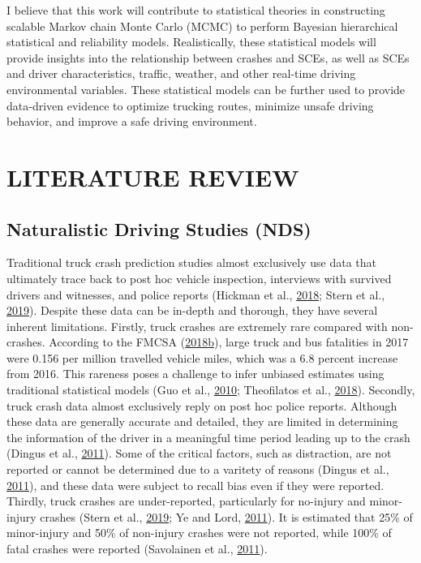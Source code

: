 \documentclass[12pt]{book}
\numberwithin{equation}{chapter}
\begin{document}
I believe that this work will contribute to statistical theories in constructing scalable Markov chain Monte Carlo (MCMC) to perform Bayesian hierarchical statistical and reliability models. Realistically, these statistical models will provide insights into the relationship between crashes and SCEs, as well as SCEs and driver characteristics, traffic, weather, and other real-time driving environmental variables. These statistical models can be further used to provide data-driven evidence to optimize trucking routes, minimize unsafe driving behavior, and improve a safe driving environment.

\hypertarget{literature-review}{%
\chapter{LITERATURE REVIEW}\label{literature-review}}

\hypertarget{naturalistic-driving-studies-nds}{%
\section{Naturalistic Driving Studies (NDS)}\label{naturalistic-driving-studies-nds}}

Traditional truck crash prediction studies almost exclusively use data that ultimately trace back to post hoc vehicle inspection, interviews with survived drivers and witnesses, and police reports (Hickman et al., \protect\hyperlink{ref-hickman2018synthetic}{2018}; Stern et al., \protect\hyperlink{ref-stern2019data}{2019}). Despite these data can be in-depth and thorough, they have several inherent limitations. Firstly, truck crashes are extremely rare compared with non-crashes. According to the FMCSA (\protect\hyperlink{ref-fmcsareport2017}{2018}\protect\hyperlink{ref-fmcsareport2017}{b}), large truck and bus fatalities in 2017 were 0.156 per million travelled vehicle miles, which was a 6.8 percent increase from 2016. This rareness poses a challenge to infer unbiased estimates using traditional statistical models (Guo et al., \protect\hyperlink{ref-guo2010near}{2010}; Theofilatos et al., \protect\hyperlink{ref-theofilatos2018impact}{2018}). Secondly, truck crash data almost exclusively reply on post hoc police reports. Although these data are generally accurate and detailed, they are limited in determining the information of the driver in a meaningful time period leading up to the crash (Dingus et al., \protect\hyperlink{ref-dingus2011estimating}{2011}). Some of the critical factors, such as distraction, are not reported or cannot be determined due to a varitety of reasons (Dingus et al., \protect\hyperlink{ref-dingus2011estimating}{2011}), and these data were subject to recall bias even if they were reported. Thirdly, truck crashes are under-reported, particularly for no-injury and minor-injury crashes (Stern et al., \protect\hyperlink{ref-stern2019data}{2019}; Ye and Lord, \protect\hyperlink{ref-ye2011investigation}{2011}). It is estimated that 25\% of minor-injury and 50\% of non-injury crashes were not reported, while 100\% of fatal crashes were reported (Savolainen et al., \protect\hyperlink{ref-savolainen2011statistical}{2011}).
\end{document}
